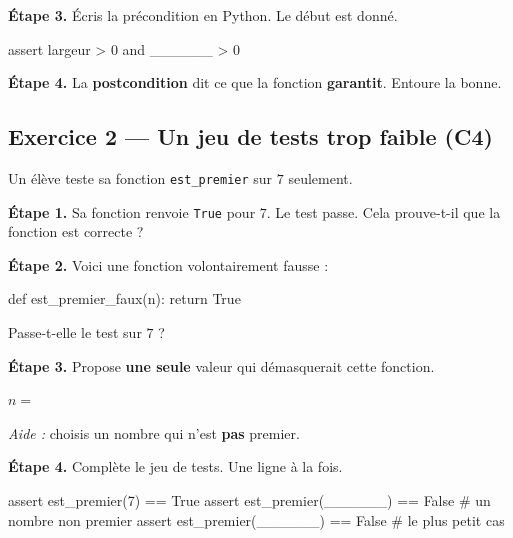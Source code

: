 \bigskip

\textbf{Étape 3.} Écris la précondition en Python. Le début est donné.

\begin{python}
    assert largeur > 0 and ______ > 0
\end{python}

\bigskip

\textbf{Étape 4.} La \textbf{postcondition} dit ce que la fonction \textbf{garantit}.
Entoure la bonne.

\medskip
\begin{center}
 \qquad {}
\end{center}

\bigskip
\bigskip

\subsection*{Exercice 2 --- Un jeu de tests trop faible (C4)}

Un élève teste sa fonction \lstinline{est_premier} sur $7$ seulement.

\bigskip

\textbf{Étape 1.} Sa fonction renvoie \lstinline{True} pour $7$. Le test passe.
Cela prouve-t-il que la fonction est correcte ?

\medskip
\begin{center}
 \qquad {}
\end{center}

\bigskip

\textbf{Étape 2.} Voici une fonction volontairement fausse :

\begin{python}
def est_premier_faux(n):
    return True
\end{python}

\medskip
Passe-t-elle le test sur $7$ ?  \qquad {}

\bigskip

\textbf{Étape 3.} Propose \textbf{une seule} valeur qui démasquerait cette fonction.

\medskip
$n = $\,\dotfill

\medskip
\textit{Aide :} choisis un nombre qui n'est \textbf{pas} premier.

\bigskip

\textbf{Étape 4.} Complète le jeu de tests. Une ligne à la fois.

\begin{python}
assert est_premier(7) == True
assert est_premier(______) == False    # un nombre non premier
assert est_premier(______) == False    # le plus petit cas
\end{python}
